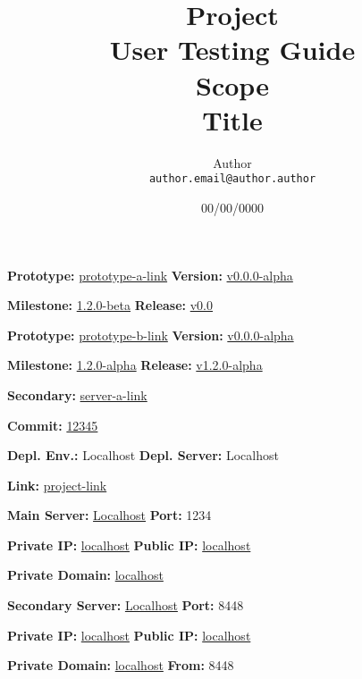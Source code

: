 \documentclass{article}
\title{
Project
\\
User Testing Guide
\\
Scope
\\
Title
}
\author{
Author\\
\texttt{author.email@author.author}
}
\date{00/00/0000}
\begin{document}
\maketitle

\textbf{Prototype:} \hyperlink{}{prototype-a-link} \hfill \textbf{Version:} \hyperlink{}{v0.0.0-alpha}

\textbf{Milestone:} \hyperlink{https://github.com/MIMBCD-UI/prototype-breast-screening/milestone/1}{1.2.0-beta} \hfill \textbf{Release:} \hyperlink{}{v0.0}

\hfill

\textbf{Prototype:} \hyperlink{}{prototype-b-link} \hfill \textbf{Version:} \hyperlink{}{v0.0.0-alpha}

\textbf{Milestone:} \hyperlink{https://github.com/mida-project/prototype-multi-modality-assistant/milestone/2}{1.2.0-alpha} \hfill \textbf{Release:} \hyperlink{https://github.com/mida-project/prototype-multi-modality-assistant/releases/tag/v1.2.0-alpha}{v1.2.0-alpha}

\hfill

\textbf{Secondary:} \hyperlink{}{server-a-link}

\textbf{Commit:} \hyperlink{}{12345}

\hfill

\textbf{Depl. Env.:} Localhost \hfill \textbf{Depl. Server:} Localhost

\textbf{Link:} \hyperlink{}{project-link}

\hfill

\textbf{Main Server:} \hyperlink{}{Localhost} \hfill \textbf{Port:} 1234

\textbf{Private IP:} \hyperlink{}{localhost} \hfill \textbf{Public IP:} \hyperlink{}{localhost}

\textbf{Private Domain:} \hyperlink{}{localhost}

\hfill

\textbf{Secondary Server:} \hyperlink{}{Localhost} \hfill \textbf{Port:} 8448

\textbf{Private IP:} \hyperlink{}{localhost} \hfill \textbf{Public IP:} \hyperlink{}{localhost}

\textbf{Private Domain:} \hyperlink{}{localhost} \hfill \textbf{From:} 8448

\clearpage














\clearpage



\end{document}
